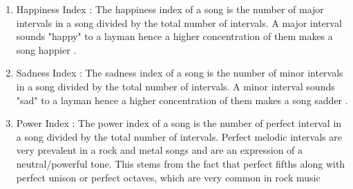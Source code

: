 \begin{enumerate}
\item Happiness Index : The happiness index of a song is the number of major intervals in a song divided by the total number of intervals. A major interval sounds "happy" to a layman hence a higher concentration of them makes a song happier \cite{majorvsminorintervals}. 
\item Sadness Index : The sadness index of a song is the number of minor intervals \cite{minorintervalssad}  in a song divided by the total number of intervals. A minor interval sounds "sad" to a layman hence a higher concentration of them makes a song sadder \cite{majorvsminorintervals}. 
\item Power Index : The power index of a song is the number of perfect interval in a song divided by the total number of intervals. Perfect melodic intervals are very prevalent in a rock and metal songs and are an expression of a neutral/powerful tone. This stems from the fact that perfect fifths along with perfect unison or perfect octaves, which are very common in rock music \cite{foundationsOfRock} 
\end{enumerate}